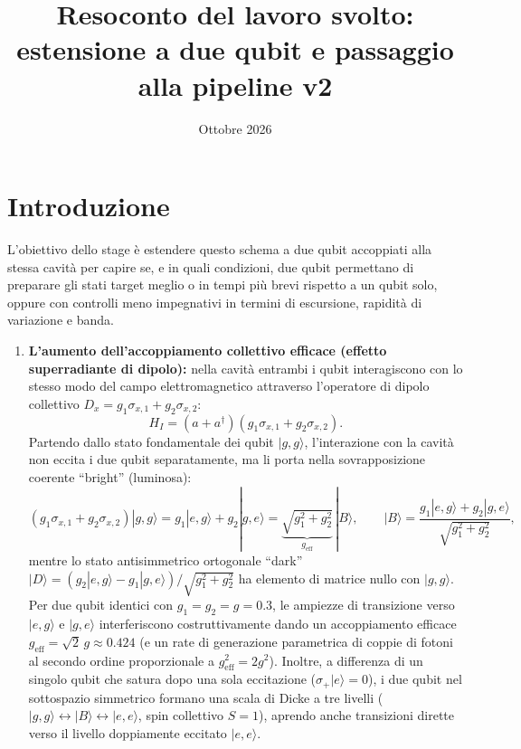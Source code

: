 \documentclass[11pt,a4paper]{article}
\title{\textbf{Resoconto del lavoro svolto:\\estensione a due qubit e passaggio alla pipeline v2}}
\date{Ottobre 2026}
\begin{document}
\maketitle

\section{Introduzione}

\noindent
L'obiettivo dello stage è estendere questo schema a due qubit accoppiati alla stessa cavità per capire se, e in quali condizioni, due qubit permettano di preparare gli stati target meglio o in tempi più brevi rispetto a un qubit solo, oppure con controlli meno impegnativi in termini di escursione, rapidità di variazione e banda.

\begin{enumerate}
    \item \textbf{L'aumento dell'accoppiamento collettivo efficace (effetto superradiante di dipolo):} nella cavità entrambi i qubit interagiscono con lo stesso modo del campo elettromagnetico attraverso l'operatore di dipolo collettivo $D_x = g_1 \sigma_{x,1} + g_2 \sigma_{x,2}$:
    \begin{equation}
        H_I = (a + a^\dagger)\left(g_1 \sigma_{x,1} + g_2 \sigma_{x,2}\right).
    \end{equation}
    Partendo dallo stato fondamentale dei qubit $|g,g\rangle$, l'interazione con la cavità non eccita i due qubit separatamente, ma li porta nella sovrapposizione coerente ``bright'' (luminosa):
    \begin{equation}
        \left(g_1 \sigma_{x,1} + g_2 \sigma_{x,2}\right)|g,g\rangle = g_1 |e,g\rangle + g_2 |g,e\rangle = \underbrace{\sqrt{g_1^2 + g_2^2}}_{g_{\text{eff}}}\,|B\rangle, \qquad |B\rangle = \frac{g_1 |e,g\rangle + g_2 |g,e\rangle}{\sqrt{g_1^2 + g_2^2}},
    \end{equation}
    mentre lo stato antisimmetrico ortogonale ``dark'' $|D\rangle = (g_2|e,g\rangle - g_1|g,e\rangle)/\sqrt{g_1^2+g_2^2}$ ha elemento di matrice nullo con $|g,g\rangle$. Per due qubit identici con $g_1 = g_2 = g = 0.3$, le ampiezze di transizione verso $|e,g\rangle$ e $|g,e\rangle$ interferiscono costruttivamente dando un accoppiamento efficace $g_{\text{eff}} = \sqrt{2}\,g \approx 0.424$ (e un rate di generazione parametrica di coppie di fotoni al secondo ordine proporzionale a $g_{\text{eff}}^2 = 2g^2$). Inoltre, a differenza di un singolo qubit che satura dopo una sola eccitazione ($\sigma_+|e\rangle = 0$), i due qubit nel sottospazio simmetrico formano una scala di Dicke a tre livelli ($|g,g\rangle \leftrightarrow |B\rangle \leftrightarrow |e,e\rangle$, spin collettivo $S=1$), aprendo anche transizioni dirette verso il livello doppiamente eccitato $|e,e\rangle$.

\end{enumerate}
\end{document}
